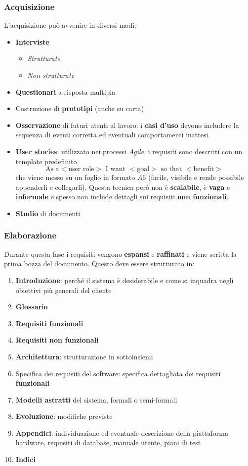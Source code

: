 \subsubsection{Acquisizione}
L'acquisizione può avvenire in diversi modi:
\begin{itemize}
	\item \textbf{Interviste}
	\begin{itemize}
		\item \textit{Strutturate}
		\item \textit{Non strutturate}
	\end{itemize}
	\item \textbf{Questionari} a risposta multipla
	\item Costruzione di \textbf{prototipi} (anche su carta)
	\item \textbf{Osservazione} di futuri utenti al lavoro: i \textbf{casi d'uso} devono includere la sequenza di eventi corretta ed eventuali comportamenti inattesi
	\item \textbf{User stories}: utilizzato nei processi \textit{Agile}, i requisiti sono descritti con un template predefinito
	\begin{equation*}
		\text{As a} <\text{user role}>\text{ I want }<\text{goal}>\text{ so that }<\text{benefit}>
	\end{equation*}
	che viene messo su un foglio in formato $A6$ (facile, visibile e rende possibile appenderli e collegarli). Questa tecnica però non è \textbf{scalabile}, è \textbf{vaga} e \textbf{informale} e spesso non include dettagli sui requisiti \textbf{non funzionali}.
	\item \textbf{Studio} di documenti
\end{itemize}

\subsubsection{Elaborazione}
Durante questa fase i requisiti vengono \textbf{espansi} e \textbf{raffinati} e viene scritta la prima bozza del documento. Questo deve essere strutturato in:
\begin{enumerate}
	\item \textbf{Introduzione}: perché il sistema è desiderabile e come si inquadra negli obiettivi più generali del cliente
	\item \textbf{Glossario}
	\item \textbf{Requisiti funzionali}
	\item \textbf{Requisiti non funzionali}
	\item \textbf{Architettura}: strutturazione in sottoinsiemi
	\item Specifica dei requisiti del software: specifica dettagliata dei requisiti \textbf{funzionali}
	\item \textbf{Modelli astratti} del sistema, formali o semi-formali
	\item \textbf{Evoluzione}: modifiche previste
	\item \textbf{Appendici}: individuazione ed eventuale descrizione della piattaforma hardware, requisiti di database, manuale utente, piani di test
	\item \textbf{Indici}
\end{enumerate}

